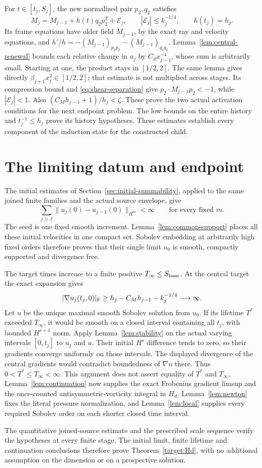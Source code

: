 For $t\in[t_j,S_j]$, the new normalized pair $p_2,q_2$ satisfies
\[
 M_j=M_{j-1}+h(t)q_2p_2^T+\mathcal E_j,
 \qquad |\mathcal E_j|\leq k_j^{-1/4},\qquad h(t_j)=h_j.
\]
Its frame equations have older field $M_{j-1}$, by the exact ray and
velocity equations, and $h'/h=-(M_{j-1})_{p_2p_2}-(M_{j-1})_{q_2q_2}$.
Lemma~\ref{lem:central-renewal} bounds each relative change in $a_j$
by $C_dx_{j-1}^{-4}$, whose sum is arbitrarily small. Starting at one,
the product stays in $[1/2,2]$. The same lemma gives directly
$\beta_{j+1}x_j^2\in[1/2,2]$; that estimate is not multiplied across
stages. Its compression bound and \eqref{eq:shear-separation} give
$p_2\cdot M_{j-1}p_2<-1$, while $|\mathcal E_j|<1$.
Also $(C_Mh_{j-1}+1)/h_j<\zeta$. These prove the two actual activation
conditions for the next endpoint problem. The low bounds on the entire
history and $t_j^{-1}\leq h_j$ prove its history hypotheses.
These estimates establish every component of the induction state
for the constructed child.

\section{The limiting datum and endpoint}
\label{sec:endpoint}
The initial estimates of Section~\ref{sec:initial-summability}, applied
to the same joined finite families and the actual source envelope, give
\[
 \sum_{j\geq J}\|u_j(0)-u_{j-1}(0)\|_{H^m}<\infty
                         \qquad\text{for every fixed }m.
\]
The seed is one fixed smooth increment. Lemma~\ref{lem:common-support}
places all these initial velocities in one compact set. Sobolev embedding
at arbitrarily high fixed orders therefore proves that their single limit
$u_0$ is smooth, compactly supported and divergence free.

The target times increase to a finite positive $T_\infty\leq S_{\rm base}$.
At the central target the exact expansion gives
\[
 |\nabla u_j(t_j,0)|_{\rm F}
       \geq h_j-C_Mh_{j-1}-k_j^{-1/4}\longrightarrow\infty.
\]
Let $u$ be the unique maximal smooth Sobolev solution from $u_0$.
If its lifetime $T^*$ exceeded $T_\infty$, it would be smooth on a
closed interval containing all $t_j$, with bounded $H^{s+1}$ norm.
Apply Lemma~\ref{lem:stability} on the actual varying intervals
$[0,t_j]$ to $u_j$ and $u$. Their initial $H^s$ difference tends to
zero, so their gradients converge uniformly on those intervals.
The displayed divergence of the central gradients would contradict
boundedness of $\nabla u$ there. Thus $0<T^*\leq T_\infty<\infty$.
This argument does not assert equality of $T^*$ and $T_\infty$.
Lemma~\ref{lem:continuation} now supplies the exact Frobenius gradient
limsup and the once-counted antisymmetric-vorticity integral in $H_d$.
Lemma~\ref{lem:newton} fixes the literal pressure normalization, and
Lemma~\ref{lem:local} supplies every required Sobolev order on each
shorter closed time interval.

The quantitative joined-source estimate and the prescribed scale
sequence verify the hypotheses at every finite stage. The initial limit,
finite lifetime and continuation conclusions therefore prove
Theorem~\ref{target:Hd}, with no additional assumption on the dimension
or on a prospective solution.
